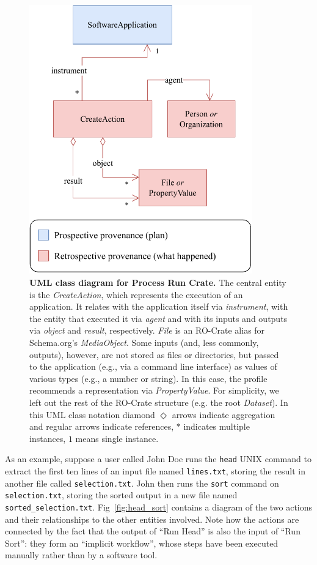 \documentclass[10pt,letterpaper]{article}
\begin{document}
\begin{figure}[!h]
\includegraphics[width=26em]{wrroc-figure1.drawio.pdf}
\caption{{\bf UML class diagram for Process Run Crate.}
The central entity is the \emph{CreateAction}, which represents the execution of an application.
It relates with the application itself via \emph{instrument}, with the entity that executed it via \emph{agent} and with its inputs and outputs via \emph{object}
and \emph{result}, respectively. 
\emph{File} is an RO-Crate alias for Schema.org's \emph{MediaObject}.
Some inputs (and, less commonly, outputs), however, are not stored as files or directories, but passed to the application (e.g., via a command line interface) as values of various types (e.g., a number or string). In this case, the profile recommends a representation via \emph{PropertyValue}. 
For simplicity, we left out the rest of the RO-Crate structure (e.g. the root \emph{Dataset}). In this UML class notation diamond $\Diamond$ arrows indicate aggregation and regular arrows indicate references, $*$ indicates multiple instances, $1$ means single instance.  
}
\label{fig:process_crate_er}
\end{figure}

As an example,
suppose a user called John Doe runs the \texttt{head} UNIX command to extract the first ten lines of an input file named \texttt{lines.txt}, storing the result in another file called \texttt{selection.txt}.
John then runs the \texttt{sort}
command on \texttt{selection.txt}, storing the sorted output in a new file named \texttt{sorted\_selection.txt}.
Fig~\ref{fig:head_sort} contains a diagram of the two actions and their relationships to the other entities involved.
Note how the actions are connected by the fact that the output of ``Run Head'' is also the input of ``Run Sort'': they form an ``implicit workflow'', whose steps have been executed manually rather than by a software tool.
\end{document}
